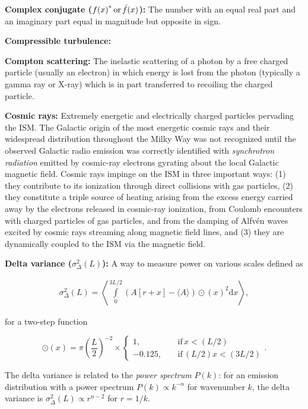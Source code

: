 \documentclass[a4paper,11pt]{article}
\begin{document}
{\noindent}\textbf{Complex conjugate (${f(x)}^*\,{\rm or}\,\bar{f}(x)$):} The number with an equal real part and an imaginary part equal in magnitude but opposite in sign.

{\noindent}\textbf{Compressible turbulence:}

{\noindent}\textbf{Compton scattering:} The inelastic scattering of a photon by a free charged particle (usually an electron) in which energy is lost from the photon (typically a gamma ray or X-ray) which is in part transferred to recoiling the charged particle.

{\noindent}\textbf{Cosmic rays:} Extremely energetic and electrically charged particles pervading the ISM. The Galactic origin of the most energetic cosmic rays and their widespread distribution throughout the Milky Way was not recognized until the observed Galactic radio emission was correctly identified with \textit{synchrotron radiation} emitted by cosmic-ray electrons gyrating about the local Galactic magnetic field. Cosmic rays impinge on the ISM in three important ways: (1) they contribute to its ionization through direct collisions with gas particles, (2) they constitute a triple source of heating arising from the excess energy carried away by the electrons released in cosmic-ray ionization, from Coulomb encounters with charged particles of gas particles, and from the damping of Alfv\'en waves excited by cosmic rays streaming along magnetic field lines, and (3) they are dynamically coupled to the ISM via the magnetic field.

{\noindent}\textbf{Delta variance ($\sigma_\Delta^2(L)$):} A way to measure power on various scales defined as

\begin{align*}
    \sigma_\Delta^2(L) = \left\langle \int\limits_0^{3L/2} {(A[r+x]-\langle A\rangle)\odot(x)}^2\mathrm{d}x \right\rangle,
\end{align*}

{\noindent}for a two-step function

\begin{equation*}
\odot(x) = \pi\left(\frac{L}{2}\right)^{-2} \times
\left\{
\begin{aligned}
1,          ~~~~~& \mathrm{if}\,x<(L/2) \\
-0.125, ~~~~~& \mathrm{if}\,(L/2)x<(3L/2)
\end{aligned}
\right.
.
\end{equation*}

{\noindent}The delta variance is related to the \textit{power spectrum} $P(k)$: for an emission distribution with a power spectrum $P(k)\propto k^{-n}$ for wavenumber $k$, the delta variance is $\sigma_\Delta^2(L)\propto r^{n-2}$ for $r=1/k$.
\end{document}
